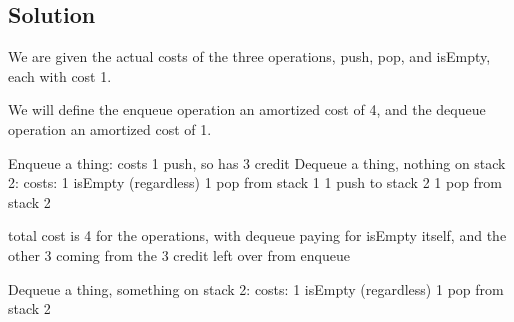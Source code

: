 \subsection*{Solution}

We are given the actual costs of the three operations, push, pop, and isEmpty, each with cost 1.

We will define the enqueue operation an amortized cost of 4, and the dequeue operation an amortized cost of 1.

Enqueue a thing: 
costs 1 push, so has 3 credit
Dequeue a thing, nothing on stack 2:
  costs:
  1 isEmpty (regardless)
  1 pop from stack 1
  1 push to stack 2
  1 pop from stack 2

total cost is 4 for the operations, with dequeue paying for isEmpty itself, and the other 3 coming from the 3 credit left over from enqueue

Dequeue a thing, something on stack 2:
  costs:
  1 isEmpty (regardless)
  1 pop from stack 2
